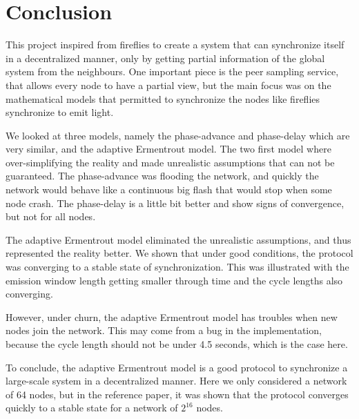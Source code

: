 \documentclass[a4paper, 11pt]{article}
\theoremstyle{plain}
\theoremstyle{definition}
\begin{document}
   
\section{Conclusion}
\label{sec:conclusion}

  
  This project inspired from fireflies to create a system that can synchronize itself in a decentralized
  manner, only by getting partial information of the global system from the neighbours. One important piece is
  the peer sampling service, that allows every node to have a partial view, but the main focus was on the
  mathematical models that permitted to synchronize the nodes like fireflies synchronize to emit light.

  We looked at three models, namely the phase-advance and phase-delay which are very similar, and the
  adaptive Ermentrout model. The two first model where over-simplifying the reality and made unrealistic
  assumptions that can not be guaranteed. The phase-advance was flooding the network, and quickly the network
  would behave like a continuous big flash that would stop when some node crash. The phase-delay is a little
  bit better and show signs of convergence, but not for all nodes. 

  The adaptive Ermentrout model eliminated the unrealistic assumptions, and thus represented the reality
  better. We shown that under good conditions, the protocol was converging to a stable state of
  synchronization. This was illustrated with the emission window length getting smaller through time and the
  cycle lengths also converging.

  However, under churn, the adaptive Ermentrout model has troubles when new nodes join the network. This may
  come from a bug in the implementation, because the cycle length should not be under 4.5 seconds, which is
  the case here.

  To conclude, the adaptive Ermentrout model is a good protocol to synchronize a large-scale system in a
  decentralized manner. Here we only considered a network of 64 nodes, but in the reference paper, it was
  shown that the protocol converges quickly to a stable state for a network of $2^{16}$ nodes. 


    
    
    












	
\end{document}

